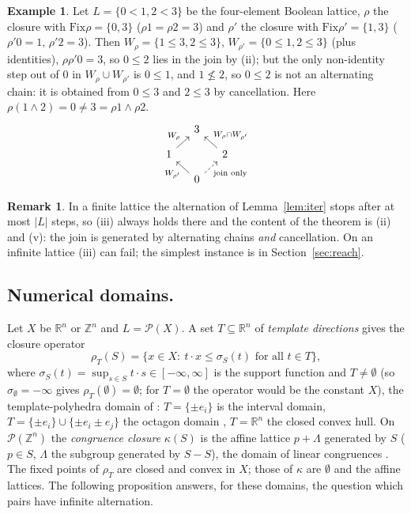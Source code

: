 \documentclass[11pt]{amsart}
\theoremstyle{definition}
\newtheorem{rem}[thm]{Remark}
\newtheorem{ex}[thm]{Example}
\newcommand{\Fix}{\mathrm{Fix}}
\newcommand{\cP}{\mathcal P}
\begin{document}
\begin{ex}\label{ex:square}
Let $L=\{0<1,2<3\}$ be the four-element Boolean lattice, $\rho$ the closure
with $\Fix\rho=\{0,3\}$ ($\rho1=\rho2=3$) and $\rho'$ the closure with
$\Fix\rho'=\{1,3\}$ ($\rho'0=1$, $\rho'2=3$). Then $W_\rho=\{1\le3,2\le3\}$,
$W_{\rho'}=\{0\le1,2\le3\}$ (plus identities), $\rho\rho'0=3$, so
$0\le2$ lies in the join by (ii); but the only non-identity step out of
$0$ in $W_\rho\cup W_{\rho'}$ is $0\le1$, and $1\not\le2$, so $0\le2$ is
not an alternating chain: it is obtained from $0\le3$ and $2\le3$ by
cancellation. Here $\rho(1\wedge2)=0\ne3=\rho1\wedge\rho2$.
\[
\begin{tikzcd}[row sep=small,column sep=small]
& 3 & \\
1\arrow[ur,"W_\rho"] & & 2\arrow[ul,"W_\rho\cap W_{\rho'}"'] \\
& 0\arrow[ul,"W_{\rho'}"]\arrow[ur,dashed,"\text{join only}"'] &
\end{tikzcd}
\]
\end{ex}

\begin{rem}
In a finite lattice the alternation of Lemma~\ref{lem:iter} stops after
at most $|L|$ steps, so (iii) always holds there and the content of the
theorem is (ii) and (v): the join is generated by alternating chains
\emph{and} cancellation. On an infinite lattice (iii) can fail; the
simplest instance is in Section~\ref{sec:reach}.
\end{rem}


\subsection*{Numerical domains.}
Let $X$ be $\mathbb R^n$ or $\mathbb Z^n$ and $L=\cP(X)$. A set
$T\subseteq\mathbb R^n$ of \emph{template directions} gives the closure
operator
\[
\rho_T(S)=\{x\in X:\ t\cdot x\le\sigma_S(t)\text{ for all }t\in T\},
\]
where $\sigma_S(t)=\sup_{s\in S}t\cdot s\in[-\infty,\infty]$ is the
support function and $T\ne\emptyset$ (so $\sigma_\emptyset=-\infty$
gives $\rho_T(\emptyset)=\emptyset$; for $T=\emptyset$ the operator
would be the constant $X$), the template-polyhedra domain of
\cite{SSM}: $T=\{\pm e_i\}$ is the interval domain, $T=\{\pm e_i\}\cup
\{\pm e_i\pm e_j\}$ the octagon domain \cite{Mine}, $T=\mathbb R^n$ the
closed convex hull. On $\cP(\mathbb Z^n)$ the \emph{congruence closure}
$\kappa(S)$ is the affine lattice $p+\Lambda$ generated by $S$ ($p\in S$,
$\Lambda$ the subgroup generated by $S-S$), the domain of linear
congruences \cite{Karr,Granger91}. The fixed points of $\rho_T$ are
closed and convex in $X$; those of $\kappa$ are $\emptyset$ and the
affine lattices. The following proposition answers, for these domains,
the question which pairs have infinite alternation.
\end{document}
